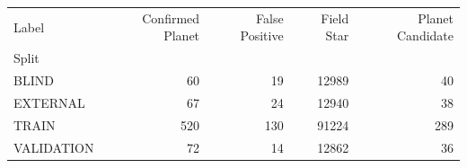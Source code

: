 \begin{tabular}{lrrrr}
\toprule
Label & Confirmed Planet & False Positive & Field Star & Planet Candidate \\
Split &  &  &  &  \\
\midrule
BLIND & 60 & 19 & 12989 & 40 \\
EXTERNAL & 67 & 24 & 12940 & 38 \\
TRAIN & 520 & 130 & 91224 & 289 \\
VALIDATION & 72 & 14 & 12862 & 36 \\
\bottomrule
\end{tabular}

